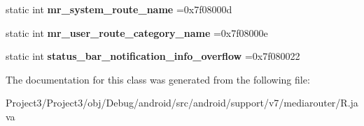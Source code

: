 \begin{DoxyCompactItemize}
static int {\bfseries mr\+\_\+system\+\_\+route\+\_\+name} =0x7f08000d
\item 
\mbox{\label{classandroid_1_1support_1_1v7_1_1mediarouter_1_1R_1_1string_a29dbf2ff6d04ff150708d5b03a15019a}} 
static int {\bfseries mr\+\_\+user\+\_\+route\+\_\+category\+\_\+name} =0x7f08000e
\item 
\mbox{\label{classandroid_1_1support_1_1v7_1_1mediarouter_1_1R_1_1string_a4e7cd67cea038f8976a1835530cb75eb}} 
static int {\bfseries status\+\_\+bar\+\_\+notification\+\_\+info\+\_\+overflow} =0x7f080022
\end{DoxyCompactItemize}


The documentation for this class was generated from the following file\+:\begin{DoxyCompactItemize}
\item 
Project3/\+Project3/obj/\+Debug/android/src/android/support/v7/mediarouter/R.\+java\end{DoxyCompactItemize}
